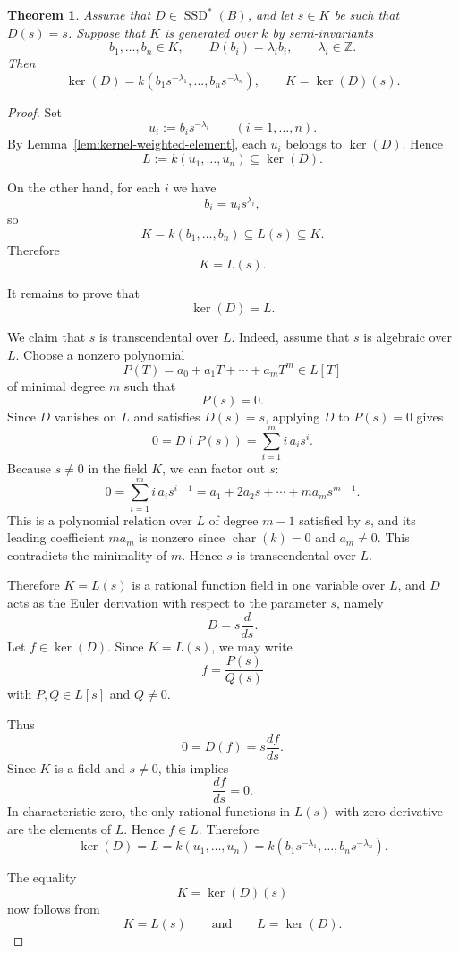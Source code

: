 \documentclass[10pt,a4paper]{amsart}
\newtheorem{theorem}{Theorem}
\newcommand{\SSD}{\operatorname{SSD}}
\newcommand{\Z}{\mathbb Z}
\begin{document}
\begin{theorem}\label{thm:kernel-fraction-field}
Assume that $D\in \SSD^{*}(B)$, and let $s\in K$ be such that $D(s)=s$.
Suppose that $K$ is generated over $k$ by semi-invariants
\[
b_1,\dots,b_n\in K,
\qquad
D(b_i)=\lambda_i b_i,
\qquad
\lambda_i\in \Z.
\]
Then
\[
\ker(D)=k\left(b_1s^{-\lambda_1},\dots,b_ns^{-\lambda_n}\right),
\qquad
K=\ker(D)(s).
\]
\end{theorem}

\begin{proof}
Set
\[
u_i:=b_i s^{-\lambda_i}\qquad (i=1,\dots,n).
\]
By Lemma~\ref{lem:kernel-weighted-element}, each $u_i$ belongs to $\ker(D)$. Hence
\[
L:=k(u_1,\dots,u_n)\subseteq \ker(D).
\]

On the other hand, for each $i$ we have
\[
b_i=u_i s^{\lambda_i},
\]
so
\[
K=k(b_1,\dots,b_n)\subseteq L(s)\subseteq K.
\]
Therefore
\[
K=L(s).
\]

It remains to prove that
\[
\ker(D)=L.
\]

We claim that $s$ is transcendental over $L$. Indeed, assume that $s$ is algebraic over $L$.
Choose a nonzero polynomial
\[
P(T)=a_0+a_1T+\cdots+a_mT^m\in L[T]
\]
of minimal degree $m$ such that
\[
P(s)=0.
\]
Since $D$ vanishes on $L$ and satisfies $D(s)=s$, applying $D$ to $P(s)=0$ gives
\[
0=D(P(s))=\sum_{i=1}^m i\,a_i s^i.
\]
Because $s\neq 0$ in the field $K$, we can factor out $s$:
\[
0=\sum_{i=1}^m i\,a_i s^{i-1} = a_1 + 2a_2 s + \cdots + m a_m s^{m-1}.
\]
This is a polynomial relation over $L$ of degree $m-1$ satisfied by $s$, and its leading
coefficient $m a_m$ is nonzero since $\operatorname{char}(k)=0$ and $a_m\neq 0$.
This contradicts the minimality of $m$. Hence $s$ is transcendental over $L$.

Therefore $K=L(s)$ is a rational function field in one variable over $L$, and $D$ acts as the Euler derivation with respect to the parameter $s$, namely
\[
D=s\frac{d}{ds}.
\]
Let $f\in \ker(D)$. Since $K=L(s)$, we may write
\[
f=\frac{P(s)}{Q(s)}
\]
with $P,Q\in L[s]$ and $Q\neq 0$.

Thus
\[
0=D(f)=s\frac{df}{ds}.
\]
Since $K$ is a field and $s\neq 0$, this implies
\[
\frac{df}{ds}=0.
\]
In characteristic zero, the only rational functions in $L(s)$ with zero derivative are the elements of $L$. Hence $f\in L$. Therefore
\[
\ker(D)=L
=
k(u_1,\dots,u_n)
=
k\left(b_1s^{-\lambda_1},\dots,b_ns^{-\lambda_n}\right).
\]

The equality
\[
K=\ker(D)(s)
\]
now follows from
\[
K=L(s)
\qquad\text{and}\qquad
L=\ker(D).
\]
\end{proof}
\end{document}
